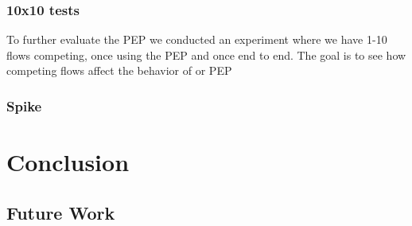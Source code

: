 \documentclass[a4paper,english, 11pt]{report}
\begin{document}

\subsection{10x10 tests}
To further evaluate the PEP we conducted an experiment where we have 1-10 flows competing, once using the PEP and once end to end. The goal is to see how competing flows affect the behavior of or PEP

\subsection{Spike}

\chapter{Conclusion}

\section{Future Work}

{}

\end{document}
